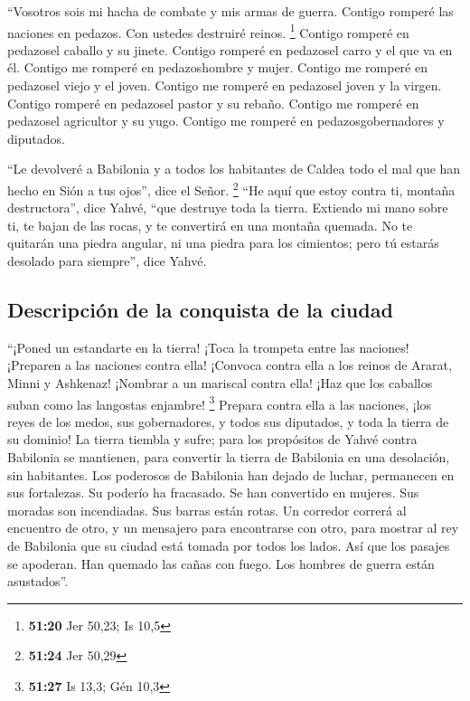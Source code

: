  ``Vosotros sois mi hacha de combate y mis armas de
guerra. Contigo romperé las naciones en pedazos. Con ustedes destruiré
reinos. \footnote{\textbf{51:20} Jer 50,23; Is 10,5} 
Contigo romperé en pedazosel caballo y su jinete. 
Contigo romperé en pedazosel carro y el que va en él. Contigo me romperé
en pedazoshombre y mujer. Contigo me romperé en pedazosel viejo y el
joven. Contigo me romperé en pedazosel joven y la virgen.
 Contigo romperé en pedazosel pastor y su rebaño. Contigo
me romperé en pedazosel agricultor y su yugo. Contigo me romperé en
pedazosgobernadores y diputados.

 ``Le devolveré a Babilonia y a todos los habitantes de
Caldea todo el mal que han hecho en Sión a tus ojos'', dice el Señor.
\footnote{\textbf{51:24} Jer 50,29}  ``He aquí que estoy
contra ti, montaña destructora'', dice Yahvé, ``que destruye toda la
tierra. Extiendo mi mano sobre ti, te bajan de las rocas, y te
convertirá en una montaña quemada.  No te quitarán una
piedra angular, ni una piedra para los cimientos; pero tú estarás
desolado para siempre'', dice Yahvé.

\hypertarget{descripciuxf3n-de-la-conquista-de-la-ciudad}{%
\subsection{Descripción de la conquista de la
ciudad}\label{descripciuxf3n-de-la-conquista-de-la-ciudad}}

 ``¡Poned un estandarte en la tierra! ¡Toca la trompeta
entre las naciones! ¡Preparen a las naciones contra ella! ¡Convoca
contra ella a los reinos de Ararat, Minni y Ashkenaz! ¡Nombrar a un
mariscal contra ella! ¡Haz que los caballos suban como las langostas
enjambre! \footnote{\textbf{51:27} Is 13,3; Gén 10,3} 
Prepara contra ella a las naciones, ¡los reyes de los medos, sus
gobernadores, y todos sus diputados, y toda la tierra de su dominio!
 La tierra tiembla y sufre; para los propósitos de Yahvé
contra Babilonia se mantienen, para convertir la tierra de Babilonia en
una desolación, sin habitantes.  Los poderosos de
Babilonia han dejado de luchar, permanecen en sus fortalezas. Su poderío
ha fracasado. Se han convertido en mujeres. Sus moradas son incendiadas.
Sus barras están rotas.  Un corredor correrá al encuentro
de otro, y un mensajero para encontrarse con otro, para mostrar al rey
de Babilonia que su ciudad está tomada por todos los lados.
 Así que los pasajes se apoderan. Han quemado las cañas
con fuego. Los hombres de guerra están asustados''.


